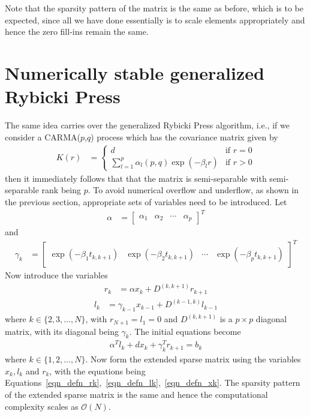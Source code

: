 \documentclass[times]{nlaauth}
\begin{document}
Note that the sparsity pattern of the matrix is the same as before, which is to be expected, since all we have done essentially is to scale elements appropriately and hence the zero fill-ins remain the same.


\section{Numerically stable generalized Rybicki Press}
The same idea carries over the generalized Rybicki Press algorithm, i.e., if we consider a CARMA($p$,$q$) process which has the covariance matrix given by
\begin{align}
K(r) & =
\begin{cases}
d & \text{if } r=0\\
\displaystyle \sum_{l=1}^p \alpha_l(p,q) \exp(-\beta_l r) & \text{if }r >0
\end{cases}
\end{align}
then it immediately follows that that the matrix is semi-separable with semi-separable rank being $p$. To avoid numerical overflow and underflow, as shown in the previous section, appropriate sets of variables need to be introduced. Let
\begin{align}
\alpha & = \begin{bmatrix} \alpha_1 & \alpha_2 & \cdots & \alpha_p\end{bmatrix}^T
\end{align}
and
\begin{align}
\gamma_k & = \begin{bmatrix}\exp(-\beta_1 t_{k,k+1})& \exp(-\beta_2 t_{k,k+1}) & \cdots& \exp(-\beta_p t_{k,k+1}) \end{bmatrix}^T
\end{align}
Now introduce the variables
\begin{align}
r_k & = \alpha x_k + D^{(k,k+1)} r_{k+1}
\label{eqn_defn_rk}
\end{align}
\begin{align}
l_{k} & = \gamma_{k-1} x_{k-1} + D^{(k-1,k)}l_{k-1}
\label{eqn_defn_lk}
\end{align}
where $k \in \{2,3,\ldots,N\}$, with $r_{N+1} = l_1 = 0$ and $D^{(k,k+1)}$ is a $p \times p$ diagonal matrix, with its diagonal being $\gamma_k$. The initial equations become
\begin{align}
\alpha^T l_k + dx_k + \gamma_k^T r_{k+1} = b_k
\label{eqn_defn_xk}
\end{align}
where $k \in \{1,2,\ldots,N\}$. Now form the extended sparse matrix using the variables $x_k,l_k$ and $r_k$, with the equations being Equations~\eqref{eqn_defn_rk},~\eqref{eqn_defn_lk},~\eqref{eqn_defn_xk}. The sparsity pattern of the extended sparse matrix is the same and hence the computational complexity scales as $\mathcal{O}(N)$.
\end{document}
